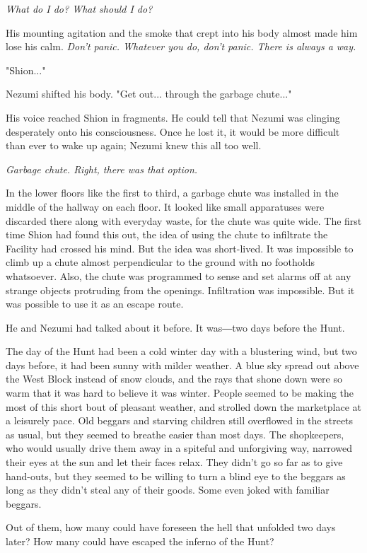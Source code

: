 \emph{What do I do? What should I do?}

His mounting agitation and the smoke that crept into his body almost
made him lose his calm. \emph{Don't panic. Whatever you do, don't panic. There
	is always a way.}

"Shion..."

Nezumi shifted his body. "Get out... through the garbage chute..."

His voice reached Shion in fragments. He could tell that Nezumi was
clinging desperately onto his consciousness. Once he lost it, it would
be more difficult than ever to wake up again; Nezumi knew this all too
well.

\emph{Garbage chute. Right, there was that option.}

In the lower floors like the first to third, a garbage chute was
installed in the middle of the hallway on each floor. It looked like
small apparatuses were discarded there along with everyday waste, for
the chute was quite wide. The first time Shion had found this out, the
idea of using the chute to infiltrate the Facility had crossed his mind.
But the idea was short-lived. It was impossible to climb up a chute
almost perpendicular to the ground with no footholds whatsoever. Also,
the chute was programmed to sense and set alarms off at any strange
objects protruding from the openings. Infiltration was impossible. But
it was possible to use it as an escape route.

He and Nezumi had talked about it before. It was―two days before the
Hunt.

The day of the Hunt had been a cold winter day with a blustering wind,
but two days before, it had been sunny with milder weather. A blue sky
spread out above the West Block instead of snow clouds, and the rays
that shone down were so warm that it was hard to believe it was winter.
People seemed to be making the most of this short bout of pleasant
weather, and strolled down the marketplace at a leisurely pace. Old
beggars and starving children still overflowed in the streets as usual,
but they seemed to breathe easier than most days. The shopkeepers, who
would usually drive them away in a spiteful and unforgiving way,
narrowed their eyes at the sun and let their faces relax. They didn't go
so far as to give hand-outs, but they seemed to be willing to turn a
blind eye to the beggars as long as they didn't steal any of their
goods. Some even joked with familiar beggars.

Out of them, how many could have foreseen the hell that unfolded two
days later? How many could have escaped the inferno of the Hunt?


